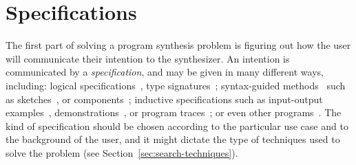 \section{Specifications}
\label{sec:specifications}

The first part of solving a program synthesis problem is figuring out how the
user will communicate their intention to the synthesizer. An intention is
communicated by a \textit{specification}, and may be given in many different
ways, including:
logical specifications~\cite{Itzhaky:SIS:2010},
type signatures~\cite{Osera:2015:TPS,
  Frankle:2016:EST, Polikarpova:2016:PSP};
syntax-guided methods~\cite{Alur:sygus:2013} such as
sketches~\cite{Solar-Lezama:2008}, or components~\cite{Feng:2017:CST,
Feng:2017:CSC, Feng:2018:PSU, Shi:2019:FCS};
inductive specifications such as input-output examples~\cite{Frankle:2016:EST,
Gulwani:2012:SDM, Leung:2015:IPS}, demonstrations~\cite{Lau2003}, or program
traces~\cite{Lau:traces:2003};
or even other programs~\cite{Srivastava:2011:PIS}.
The kind of specification should be chosen according to the particular use case
and to the background of the user, and it might dictate the type of techniques
used to solve the problem (see Section~\ref{sec:search-techniques}).





